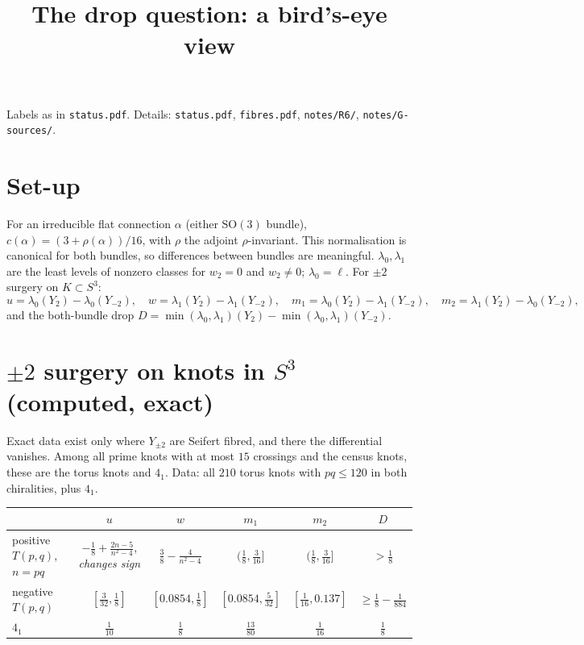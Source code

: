 \documentclass[10pt]{amsart}
\title{The drop question: a bird's-eye view}
\date{}
\begin{document}
\sloppy
\maketitle
\vspace{-2.5em}

\noindent Labels as in \texttt{status.pdf}. Details: \texttt{status.pdf},
\texttt{fibres.pdf}, \texttt{notes/R6/}, \texttt{notes/G-sources/}.

\section{Set-up}

For an irreducible flat connection $\alpha$ (either $\mathrm{SO}(3)$ bundle),
$c(\alpha)=(3+\rho(\alpha))/16$, with $\rho$ the adjoint $\rho$-invariant. This
normalisation is canonical for both bundles, so differences between bundles are
meaningful. $\lambda_0,\lambda_1$ are the least levels of nonzero classes for
$w_2=0$ and $w_2\ne0$; $\lambda_0=\ell$. For $\pm2$ surgery on $K\subset S^3$:
\[
u=\lambda_0(Y_2)-\lambda_0(Y_{-2}),\quad w=\lambda_1(Y_2)-\lambda_1(Y_{-2}),\quad
m_1=\lambda_0(Y_2)-\lambda_1(Y_{-2}),\quad m_2=\lambda_1(Y_2)-\lambda_0(Y_{-2}),
\]
and the both-bundle drop $D=\min(\lambda_0,\lambda_1)(Y_2)-\min(\lambda_0,\lambda_1)(Y_{-2})$.

\section{$\pm2$ surgery on knots in $S^3$ (computed, exact)}

Exact data exist only where $Y_{\pm2}$ are Seifert fibred, and there the
differential vanishes. Among all prime knots with at most $15$ crossings and the
census knots, these are the torus knots and $4_1$. Data: all $210$ torus knots
with $pq\le120$ in both chiralities, plus $4_1$.

\begin{center}\small
\begin{tabular}{lccccc}
 & $u$ & $w$ & $m_1$ & $m_2$ & $D$\\\hline
positive $T(p,q)$, $n=pq$ & $-\frac18+\frac{2n-5}{n^2-4}$, \emph{changes sign} & $\frac38-\frac4{n^2-4}$ & $(\frac18,\frac3{16}]$ & $(\frac18,\frac3{16}]$ & $>\frac18$\\
negative $T(p,q)$ & $[\frac3{32},\frac18]$ & $[0.0854,\frac18]$ & $[0.0854,\frac5{32}]$ & $[\frac1{16},0.137]$ & $\ge\frac18-\frac1{884}$\\
$4_1$ & $\frac1{10}$ & $\frac18$ & $\frac{13}{80}$ & $\frac1{16}$ & $\frac18$
\end{tabular}
\end{center}
\end{document}
